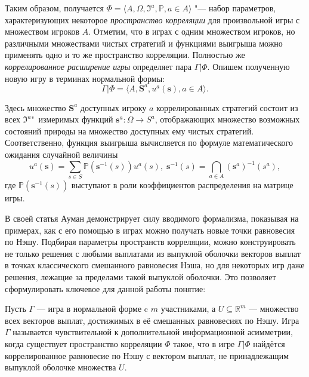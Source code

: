 Таким образом, получается $\Phi = \langle A, \Omega, \mathfrak{I}^a, \mathbb{P}, a \in A \rangle$ "--- набор параметров, характеризующих некоторое \emph{пространство корреляции} для произвольной игры с множеством игроков $A$. Отметим, что в играх с одним множеством игроков, но различными множествами чистых стратегий и функциями выигрыша можно применять одно и то же пространство корреляции. Полностью же \emph{коррелированное расширение игры} определяет пара $\Gamma | \Phi$. Опишем полученную новую игру в терминах нормальной формы:
\begin{equation*}
	\Gamma | \Phi = \langle A, \mathbf{S}^a, u^a(\mathbf{s}), a \in A \rangle.
\end{equation*}

Здесь множество $\mathbf{S}^a$ доступных игроку $a$ коррелированных стратегий состоит из всех $\mathfrak{I}^a$"~измеримых функций $\mathbf{s}^a : \Omega \rightarrow S^a$, отображающих множество возможных состояний природы на множество доступных ему чистых стратегий. Соответственно, функция выигрыша вычисляется по формуле математического ожидания случайной величины
\begin{equation*}
	u^a(\mathbf{s}) = \sum\limits_{s \in S} \mathbb{P}(\mathbf{s}^{-1}(s)) u^a(s),\;\mathbf{s}^{-1}(s) = \bigcap_{a \in A} (\mathbf{s}^a)^{-1}(s^a),
\end{equation*}
где $\mathbb{P}(\mathbf{s}^{-1}(s))$ выступают в роли коэффициентов распределения на матрице игры.

В своей статья Ауман демонстрирует силу вводимого формализма, показывая на примерах, как с его помощью в играх можно получать новые точки равновесия по Нэшу. Подбирая параметры пространств корреляции, можно конструировать не только решения с любыми выплатами из выпуклой оболочки векторов выплат в точках классического смешанного равновесия Нэша, но для некоторых игр даже решения, лежащие за пределами такой выпуклой оболочки. Это позволяет сформулировать ключевое для данной работы понятие:
\begin{definition}
	Пусть $\Gamma$ --- игра в нормальной форме c $m$ участниками, а $U \subseteq \mathbb{R}^m$ --- множество всех векторов выплат, достижимых в её смешанных равновесиях по Нэшу. Игра $\Gamma$ называется чувствительной к дополнительной информационной асимметрии, когда существует пространство корреляции $\Phi$ такое, что в игре $\Gamma | \Phi$ найдётся коррелированное равновесие по Нэшу с вектором выплат, не принадлежащим выпуклой оболочке множества $U$.
\end{definition}

